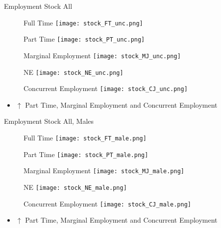 \documentclass[hyperref={bookmarks=false}]{beamer}
\let\oldcite=\cite
\renewcommand{\cite}[1]{\textcolor[rgb]{.0,.2,.7}{\oldcite{#1}}}
\begin{document}
\begin{appendix}
\begin{frame}{Employment Stock All}
\begin{figure}[!t]
	\centering
	\begin{minipage}[b]{0.4\textwidth}{Full Time}
		\centering
		\texttt{[image: stock\_FT\_unc.png]}
	\end{minipage}
	\begin{minipage}[b]{0.4\textwidth}{Part Time}
		\centering
		\texttt{[image: stock\_PT\_unc.png]}
	\end{minipage}
	\begin{minipage}[b]{0.3\textwidth}{Marginal Employment}
		\centering
		\texttt{[image: stock\_MJ\_unc.png]}
	\end{minipage}
\begin{minipage}[b]{0.3\textwidth}{NE}
	\centering
	\texttt{[image: stock\_NE\_unc.png]}
\end{minipage}
	\begin{minipage}[b]{0.3\textwidth}{Concurrent Employment}
		\centering
		\texttt{[image: stock\_CJ\_unc.png]}
	\end{minipage}
\end{figure}
\begin{itemize}
	\setlength{\itemsep}{0.7 cm}
	\item $\uparrow$ Part Time, Marginal Employment and Concurrent Employment \cite{CarriTuRo15} 
\end{itemize}
\end{frame}

\begin{frame}{Employment Stock All, Males}
\begin{figure}[!t]
\centering
\begin{minipage}[b]{0.4\textwidth}{Full Time}
	\centering
	\texttt{[image: stock\_FT\_male.png]}
\end{minipage}
\begin{minipage}[b]{0.4\textwidth}{Part Time}
	\centering
	\texttt{[image: stock\_PT\_male.png]}
\end{minipage}
\begin{minipage}[b]{0.3\textwidth}{Marginal Employment}
	\centering
	\texttt{[image: stock\_MJ\_male.png]}
\end{minipage}
\begin{minipage}[b]{0.3\textwidth}{NE}
	\centering
	\texttt{[image: stock\_NE\_male.png]}
\end{minipage}
\begin{minipage}[b]{0.3\textwidth}{Concurrent Employment}
	\centering
	\texttt{[image: stock\_CJ\_male.png]}
\end{minipage}
\end{figure}
\begin{itemize}
\setlength{\itemsep}{0.7 cm}
\item $\uparrow$ Part Time, Marginal Employment and Concurrent Employment \cite{CarriTuRo15} 
\end{itemize}
\end{frame}


\end{appendix}
\end{document}
